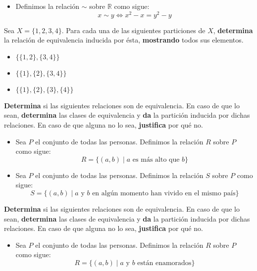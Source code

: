 \documentclass[oneside]{style}
\begin{document}
\begin{questions}[label=\protect\circled{\bfseries\arabic*}]
{\begin{itemize}
            \item Definimos la relación $\sim$ sobre $\mathbb{R}$ como 
            sigue:
            \begin{equation*}
                x \sim y \Leftrightarrow x^2 - x = y^2 - y
            \end{equation*}
        \end{itemize}
    }

    \question
    {
        Sea $X = \{1,2,3,4\}$. Para cada una de las siguientes particiones de 
        $X$, \textbf{determina} la relación de equivalencia inducida por ésta, 
        \textbf{mostrando} todos sus elementos.
        \begin{itemize}
            \item $\{\{1,2\}, \{3,4\}\}$
            \item $\{\{1\}, \{2\}, \{3,4\}\}$
            \item $\{\{1\}, \{2\}, \{3\}, \{4\}\}$
        \end{itemize}
    }

    \question
    {
        \textbf{Determina} si las siguientes relaciones son de equivalencia. 
        En caso de que lo sean, \textbf{determina} las clases de equivalencia 
        y \textbf{da} la partición inducida por dichas relaciones. En caso de 
        que alguna no lo sea, \textbf{justifica} por qué no.
        \begin{itemize}
            \item Sea $P$ el conjunto de todas las personas. Definimos la 
            relación $R$ sobre $P$ como sigue:
            \begin{equation*}
                R = \{(a,b) \; | \; a \text{ es más alto que } b \}
            \end{equation*}

            \item Sea $P$ el conjunto de todas las personas. Definimos la
            relación $S$ sobre $P$ como sigue:
            \begin{equation*}
                S = \{(a,b) \; | \; a \text{ y } b \text{ en algún momento han 
                vivido en el mismo país}\}
            \end{equation*}
        \end{itemize}
    }

    \question
    {
        \textbf{Determina} si las siguientes relaciones son de equivalencia. 
        En caso de que lo sean, \textbf{determina} las clases de equivalencia 
        y \textbf{da} la partición inducida por dichas relaciones. En caso de 
        que alguna no lo sea, \textbf{justifica} por qué no.
        \begin{itemize}
            \item Sea $P$ el conjunto de todas las personas. Definimos la 
            relación $R$ sobre $P$ como sigue:
            \begin{equation*}
                R = \{(a,b) \; | \; a \text{ y } b \text{ están enamorados}\}
            \end{equation*}


\end{itemize}}
\end{questions}
\end{document}
